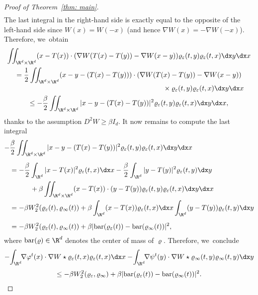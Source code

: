 \begin{proof}[Proof of Theorem~\ref{thm: main}]
\begin{multline*}
\end{multline*}
The last integral in the right-hand side is exactly equal to the opposite of the left-hand side since $W(x)=W(-x)$ (and hence $\nabla W(x)=-\nabla W(-x)$). Therefore, we~obtain
\begin{multline*}
\iint_{\R^d\times\R^d} (x- T(x))\cdot (\nabla W(T(x)-T(y)) - \nabla W(x-y)) \varrho_\varepsilon(t,y) \varrho_\varepsilon(t,x) \dx y \dx x\\
=\frac 12 \iint_{\R^d\times\R^d} (x-y - (T(x)-T(y)))\cdot (\nabla W(T(x)-T(y)) - \nabla W(x-y))\\[-3pt]
\shoveright{{}\times \varrho_\varepsilon(t,y) \varrho_\varepsilon(t,x) \dx y \dx x}\\
\leq -\frac \beta 2 \iint_{\R^d\times\R^d}|x-y - (T(x)-T(y))|^2\varrho_\varepsilon(t,y) \varrho_\varepsilon(t,x) \dx y \dx x,
\end{multline*}
thanks to the assumption $D^2W\geq \beta I_d$.
It now remains to compute the last integral
\begin{equation*}
\begin{split}
-&\frac \beta 2 \iint_{\R^d\times\R^d}|x-y - (T(x)-T(y))|^2\varrho_\varepsilon(t,y) \varrho_\varepsilon(t,x) \dx y \dx x\\[5pt]
&=- \frac\beta 2 \int_{\R^d} |x-T(x)|^2 \varrho_\varepsilon(t,x)\dx x -\frac \beta 2 \int_{\R^d} |y-T(y)|^2\varrho_{\varepsilon}(t,y) \dx y\\
&\qquad\quad + \beta \iint_{\R^d\times\R^d}(x-T(x))\cdot (y-T(y))\varrho_\varepsilon(t,y) \varrho_\varepsilon(t,x) \dx y \dx x\\
&=-\beta W_2^2(\varrho_\varepsilon(t), \varrho_\infty(t)) + \beta \int_{\R^d} (x - T(x))\varrho_\varepsilon(t,x) \dx x\int_{\R^d} (y - T(y))\varrho_{\varepsilon}(t,y) \dx y\\[5pt]
&=-\beta W_2^2(\varrho_\varepsilon(t), \varrho_\infty(t)) + \beta|\mathrm{bar}(\varrho_\varepsilon(t))- \mathrm{bar}(\varrho_\infty(t))|^2,
\end{split}
\end{equation*}
where $\mathrm{bar}(\varrho)\in\R^d$ denotes the center of mass of $\varrho$. Therefore, we~conclude
\begin{multline*}
-\! \int_{\R^d}\!\! \nabla \varphi^t (x) \cdot \nabla W\star \varrho_\varepsilon (t,x) \varrho_\varepsilon(t,x) \dx x - \!\int_{\R^d}\!\! \nabla \psi^t (y) \cdot \nabla W\star \varrho_\infty (t,y) \varrho_\infty(t,y) \dx y\\[3pt]
\leq -\beta W_2^2(\varrho_\varepsilon,\varrho_\infty) + \beta |\mathrm{bar}(\varrho_\varepsilon(t))- \mathrm{bar}(\varrho_\infty(t))|^2.

\end{multline*}
\end{proof}

